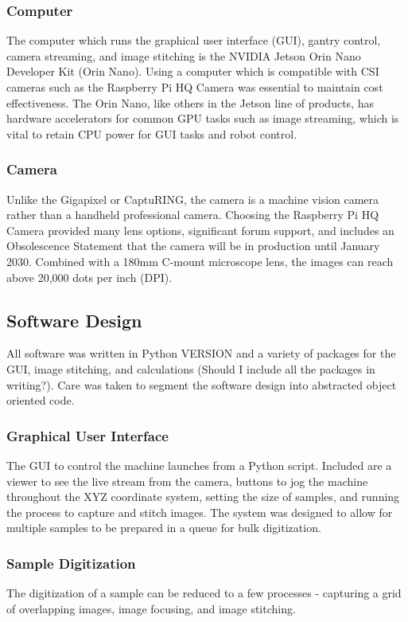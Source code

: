 \documentclass[a4paper,12pt]{article}
\begin{document}
\subsubsection{Computer}
The computer which runs the graphical user interface (GUI), gantry control, camera streaming, and image stitching is the NVIDIA Jetson Orin Nano Developer Kit (Orin Nano). Using a computer
which is compatible with CSI cameras such as the Raspberry Pi HQ Camera was essential to maintain cost effectiveness. The Orin Nano, like others in the Jetson line of products, has hardware
accelerators for common GPU tasks such as image streaming, which is vital to retain CPU power for GUI tasks and robot control. 

\subsubsection{Camera}
Unlike the Gigapixel or CaptuRING, the camera is a machine vision camera rather than a handheld professional camera. Choosing the Raspberry Pi HQ Camera provided many lens options, significant
forum support, and includes an Obsolescence Statement that the camera will be in production until January 2030. Combined with a 180mm C-mount microscope lens, the images can reach above 20,000 dots per inch (DPI).

\subsection{Software Design}
All software was written in Python VERSION and a variety of packages for the GUI, image stitching, and calculations (Should I include all the packages in writing?). Care was taken to segment the
software design into abstracted object oriented code. 

\subsubsection{Graphical User Interface}
The GUI to control the machine launches from a Python script. Included are a viewer to see the live stream from the camera, buttons to jog the machine throughout the XYZ coordinate system,
setting the size of samples, and running the process to capture and stitch images. The system was designed to allow for multiple samples to be prepared in a queue for bulk digitization. 

\subsubsection{Sample Digitization}
The digitization of a sample can be reduced to a few processes - capturing a grid of overlapping images, image focusing, and image stitching. 
\end{document}
